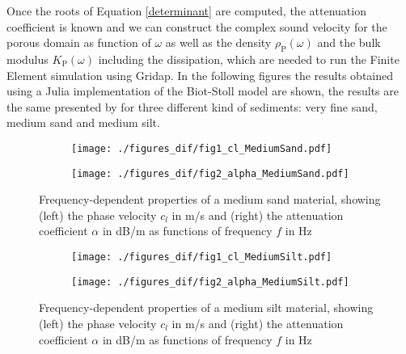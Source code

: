 \documentclass{article}[a4paper, 12pt]
\begin{document}
Once the roots of Equation \eqref{determinant} are computed, the attenuation coefficient is known and we can construct the complex sound velocity for the porous domain as function of $\omega$ as well as the density $\rho_{\mathrm{P}}(\omega)$ and the bulk modulus $K_{\mathrm{P}}(\omega)$ including the dissipation, which are needed to run the Finite Element simulation using Gridap. In the following figures the results obtained using a Julia implementation of the Biot-Stoll model are shown, the results are the same presented by \cite{kimura2007study} for three different kind of sediments: very fine sand, medium sand and medium silt.

\begin{figure}[h!]
    \centering
    \begin{subfigure}[b]{0.45\textwidth}  %
        \texttt{[image: ./figures\_dif/fig1\_cl\_MediumSand.pdf]}
    \end{subfigure}
    \hspace{0.15cm} 
    \begin{subfigure}[b]{0.45\textwidth}
        \texttt{[image: ./figures\_dif/fig2\_alpha\_MediumSand.pdf]}
    \end{subfigure}
    
    \caption{ Frequency-dependent properties of a  medium sand material, showing (left) the phase velocity $c_l$ in m/s and (right) the attenuation coefficient 
    $\alpha$ in dB/m as functions of frequency $f$ in Hz}
\end{figure}

\begin{figure}[h!]
    \centering
    \begin{subfigure}[b]{0.45\textwidth}  %
        \texttt{[image: ./figures\_dif/fig1\_cl\_MediumSilt.pdf]}
    \end{subfigure}
    \hspace{0.15cm} 
    \begin{subfigure}[b]{0.45\textwidth}
        \texttt{[image: ./figures\_dif/fig2\_alpha\_MediumSilt.pdf]}
    \end{subfigure}
    
    \caption{ Frequency-dependent properties of a  medium silt material, showing (left) the phase velocity $c_l$ in m/s and (right) the attenuation coefficient 
    $\alpha$ in dB/m as functions of frequency $f$ in Hz}
\end{figure}
\end{document}
